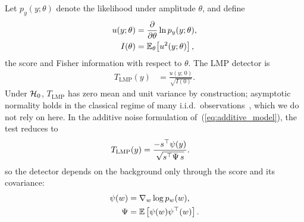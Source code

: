 Let $p_y(y;\theta)$ denote the likelihood under amplitude $\theta$, and define
\begin{align}
    u(y; \theta)
    &= \frac{\partial}{\partial \theta} \ln p_y(y;\theta), \nonumber\\
    I(\theta)
    &= \mathbb{E}_\theta\!\left[u^2(y;\theta)\right],
\end{align}
the score and Fisher information with respect to $\theta$. The LMP detector is
\begin{align}
    T_{\mathrm{LMP}}(y)
    &= \frac{u(y;\,0)}{\sqrt{I(0)}}.
    \label{eq:lmp_general}
\end{align}
Under $\mathcal{H}_0$, $T_{\mathrm{LMP}}$ has zero mean and unit variance by
construction; asymptotic normality holds in the classical regime of many
i.i.d.\ observations~\cite{kay1998detection}, which we do not rely on here.
In the  additive noise formulation of~(\ref{eq:additive_model}), the test reduces to
\begin{align}
    T_{\mathrm{LMP}}(y)
    &= \frac{-s^\top \psi(y)}{\sqrt{s^\top \Psi\, s}}.
    \label{eq:lmp_additive}
\end{align}
so the detector depends on the background only through the score and its covariance:
\begin{align}
    \psi(w) &= \nabla_w \log p_w(w), \nonumber\\
    \Psi &= \mathbb{E}\left[\psi(w)\psi^\top(w)\right].
    \label{eq:fi_add}
\end{align}